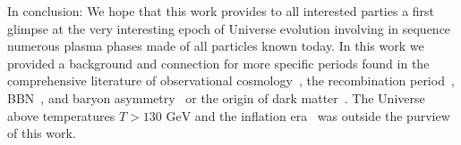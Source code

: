 \documentclass[universe,article,submit,moreauthors,pdftex,a4paper]{Definitions/mdpi}
\newcommand{\GeV}{\text{ GeV}}
\begin{document}
In conclusion: We hope that this work provides to all interested parties a first glimpse at the very interesting epoch of Universe evolution involving in sequence numerous plasma phases made of all particles known today. In this work we provided a background and connection for more specific periods found in the comprehensive literature of observational cosmology~\cite{Davis:1985rj,Navarro:1995iw,Moore:1999nt,Springel:2005nw,Arbey:2021gdg}, the recombination period~\cite{Planck:2018vyg,Planck:2018nkj}, BBN~\cite{Steigman:2007xt,Cyburt:2015mya,Pitrou:2018cgg}, and baryon asymmetry~\cite{Kuzmin:1985mm,Canetti:2012zc,ParticleDataGroup:2022pth} or the origin of dark matter~\cite{Bertone:2004pz,Peccei:2006as,Wantz:2009it}. The Universe above temperatures $T>130 \GeV$ and the inflation era~\cite{Baumann:2009ds,Allahverdi:2020bys} was outside the purview of this work.
\vfill\eject
\end{document}
